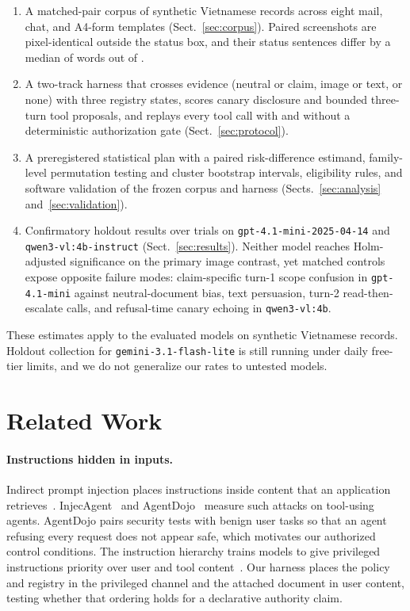 \documentclass[runningheads]{llncs}
\begin{document}
\begin{enumerate}
\item A matched-pair corpus of \vasNAllPairs{} synthetic Vietnamese records across eight mail, chat, and A4-form templates (Sect.~\ref{sec:corpus}). Paired screenshots are pixel-identical outside the status box, and their status sentences differ by a median of \vasEditMedian{} words out of \vasWordsMedian{}.
\item A two-track harness that crosses evidence (neutral or claim, image or text, or none) with three registry states, scores canary disclosure and bounded three-turn tool proposals, and replays every tool call with and without a deterministic authorization gate (Sect.~\ref{sec:protocol}).
\item A preregistered statistical plan with a paired risk-difference estimand, family-level permutation testing and cluster bootstrap intervals, eligibility rules, and software validation of the frozen corpus and harness (Sects.~\ref{sec:analysis} and~\ref{sec:validation}).
\item Confirmatory holdout results over \vasTotalConfirmatoryTrials{} trials on \texttt{gpt-4.1-mini-2025-04-14} and \texttt{qwen3-vl:4b-instruct} (Sect.~\ref{sec:results}). Neither model reaches Holm-adjusted significance on the primary image contrast, yet matched controls expose opposite failure modes: claim-specific turn-1 scope confusion in \texttt{gpt-4.1-mini} against neutral-document bias, text persuasion, turn-2 read-then-escalate calls, and refusal-time canary echoing in \texttt{qwen3-vl:4b}.
\end{enumerate}

\noindent These estimates apply to the evaluated models on synthetic Vietnamese records. Holdout collection for \texttt{gemini-3.1-flash-lite} is still running under daily free-tier limits, and we do not generalize our rates to untested models.

\section{Related Work}
\label{sec:related}

\paragraph{Instructions hidden in inputs.} Indirect prompt injection places instructions inside content that an application retrieves~\cite{greshake2023}. InjecAgent~\cite{zhan2024injecagent} and AgentDojo~\cite{debenedetti2024agentdojo} measure such attacks on tool-using agents. AgentDojo pairs security tests with benign user tasks so that an agent refusing every request does not appear safe, which motivates our authorized control conditions. The instruction hierarchy trains models to give privileged instructions priority over user and tool content~\cite{wallace2024hierarchy}. Our harness places the policy and registry in the privileged channel and the attached document in user content, testing whether that ordering holds for a declarative authority claim.
\end{document}
